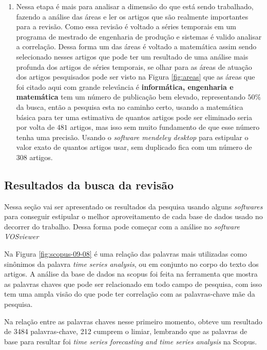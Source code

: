 \begin{enumerate}[start=1, label = {\textbf{Etapa} \arabic* } ]
\item  \label{etp:rev-4}Nessa etapa é mais para analisar a dimensão do que está sendo trabalhado, fazendo a análise das áreas e ler os artigos que são realmente importantes para a revisão. Como essa revisão é voltado a séries temporais em um programa de mestrado de engenharia de produção e sistemas é valido analisar a correlação. Dessa forma um das áreas é voltado a matemática assim sendo selecionado nesses artigos que pode ter um resultado de uma análise mais profunda dos artigos de séries temporais, se olhar para as áreas de atuação dos artigos pesquisados pode ser visto na Figura \ref{fig:areas} que as áreas que foi citado aqui com grande relevância é \textbf{informática, engenharia e matemática} tem um número de publicação bem elevado, representando $50\%$ da busca, então a pesquisa esta no caminho certo, usando a matemática básica para ter uma estimativa de quantos artigos pode ser eliminado seria por volta de $481$ artigos, mas isso sem muito fundamento de que esse número tenha uma precisão. Usando o \textit{software mendeley desktop}  para estipular o valor exato de quantos artigos usar, sem duplicado fica com um número de $308$ artigos.
\end{enumerate}

\subsection{Resultados da busca da revis\~ao}\label{subesec:resul da revisão}


Nessa seção vai ser apresentado os resultados da pesquisa usando alguns \textit{softwares} para conseguir estipular o melhor aproveitamento de cada base de dados usado no decorrer do trabalho. Dessa forma pode começar com a análise no \textit{software VOSviewer} 


Na Figura \ref{fig:scopus-09-08} é uma relação das palavras mais utilizadas como sinônimos da palavra \textit{time series analysis}, ou em conjunto no corpo do texto dos artigos.
A análise da base de dados na scopus foi feita na ferramenta que mostra as palavras chaves que pode ser relacionado em todo campo de pesquisa, com isso tem uma ampla visão do que pode ter correlação com as palavras-chave mãe da pesquisa.

Na relação entre as palavras chaves nesse primeiro momento, obteve um resultado de 3484 palavras-chave, 212 cumprem o limiar, lembrando que as palavras de base para resultar foi \textit{time series forecasting and time series analysis } na Scopus.

